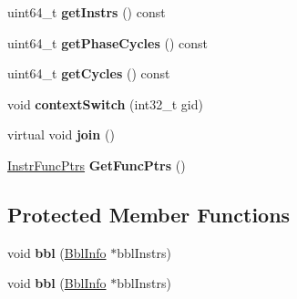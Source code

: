 \begin{DoxyCompactItemize}
\item 
\hypertarget{classNullCore_ae97e480ddfaf99874fc480fc2c54cf33}{uint64\-\_\-t {\bfseries get\-Instrs} () const }\label{classNullCore_ae97e480ddfaf99874fc480fc2c54cf33}

\item 
\hypertarget{classNullCore_a76688318cc316e0e67d46ef64a61900f}{uint64\-\_\-t {\bfseries get\-Phase\-Cycles} () const }\label{classNullCore_a76688318cc316e0e67d46ef64a61900f}

\item 
\hypertarget{classNullCore_a9094cf29201bcc8e4da303c7563a7256}{uint64\-\_\-t {\bfseries get\-Cycles} () const }\label{classNullCore_a9094cf29201bcc8e4da303c7563a7256}

\item 
\hypertarget{classNullCore_a37e0ddd3bc6cfac1e6e60a8192450f1b}{void {\bfseries context\-Switch} (int32\-\_\-t gid)}\label{classNullCore_a37e0ddd3bc6cfac1e6e60a8192450f1b}

\item 
\hypertarget{classNullCore_aac7aa6ed7cc62a24b66ae8d9003ad892}{virtual void {\bfseries join} ()}\label{classNullCore_aac7aa6ed7cc62a24b66ae8d9003ad892}

\item 
\hypertarget{classNullCore_a158673562bc43cd3e25be911b212cdfb}{\hyperlink{structInstrFuncPtrs}{Instr\-Func\-Ptrs} {\bfseries Get\-Func\-Ptrs} ()}\label{classNullCore_a158673562bc43cd3e25be911b212cdfb}

\end{DoxyCompactItemize}
\subsection*{Protected Member Functions}
\begin{DoxyCompactItemize}
\item 
\hypertarget{classNullCore_a85a4f1a2b9e2060751889d65cba34300}{void {\bfseries bbl} (\hyperlink{structBblInfo}{Bbl\-Info} $\ast$bbl\-Instrs)}\label{classNullCore_a85a4f1a2b9e2060751889d65cba34300}

\item 
\hypertarget{classNullCore_a85a4f1a2b9e2060751889d65cba34300}{void {\bfseries bbl} (\hyperlink{structBblInfo}{Bbl\-Info} $\ast$bbl\-Instrs)}\label{classNullCore_a85a4f1a2b9e2060751889d65cba34300}

\end{DoxyCompactItemize}
